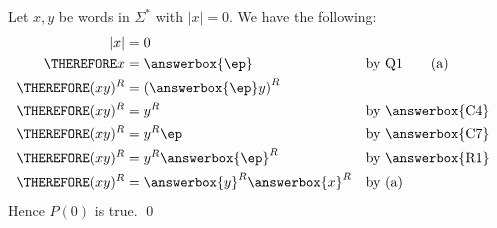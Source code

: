         Let $x, y$ be words in $\Sigma^*$ with $|x| = 0$.
We have the following:
\begin{align*}
              |x| &= 0                                                 \\
\THEREFORE      x &= \answerbox{ \ep }        & & \text{by Q1} \tag{a}     \\
\THEREFORE (xy)^R &= \left( \answerbox{ \ep } y \right)^R  & &                          \\
\THEREFORE (xy)^R &= y^R                  & & \text{by \answerbox{C4}}  \\
\THEREFORE (xy)^R &= y^R \ep              & & \text{by \answerbox{C7}}  \\
\THEREFORE (xy)^R &= y^R \answerbox{ \ep }^R  & & \text{by \answerbox{R1}}  \\
\THEREFORE (xy)^R &= \answerbox{y}^R \answerbox{x}^R & & \text{by (a)} 
\end{align*}
Hence $P(0)$ is true.
\qed
\\

